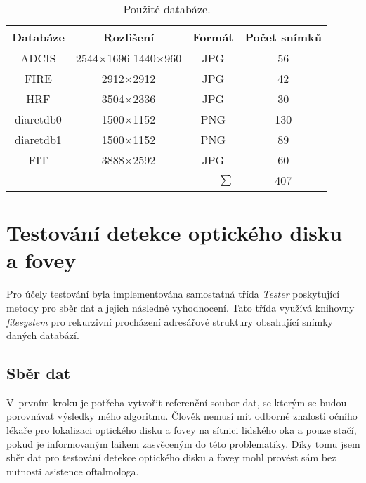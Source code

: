 \begin{table}[ht]
  \begin{center}	
    \begin{tabular}{|c|c|c|c|}
      \hline
      \textbf{Databáze} & \textbf{Rozlišení} & \textbf{Formát} & \textbf{Počet snímků} \\
      \hline
      ADCIS     & \makecell{2544$\times$1696\\ 1440$\times$960} & JPG &  56\\
      \hline
      FIRE      & 2912$\times$2912                            & JPG &  42\\
      \hline
      HRF       & 3504$\times$2336                            & JPG &  30\\
      \hline
      diaretdb0 & 1500$\times$1152                            & PNG & 130\\
      \hline
      diaretdb1 & 1500$\times$1152                            & PNG &  89\\
      \hline
      FIT       & 3888$\times$2592                            & JPG &  60\\
      \hline
      \multicolumn{3}{|r|}{$\sum$}                                   & 407\\
      \hline
    \end{tabular}
  \caption{Použité databáze.}
  \label{tab:databases}
  \end{center}
\end{table}


\section{Testování detekce optického disku a fovey}
Pro účely testování byla implementována samostatná třída \emph{Tester} poskytující metody pro sběr dat a jejich následné vyhodnocení. Tato třída využívá knihovny \emph{filesystem} pro rekurzivní procházení adresářové struktury obsahující snímky daných databází.

\subsection*{Sběr dat} 
V~prvním kroku je potřeba vytvořit referenční soubor dat, se kterým se budou porovnávat výsledky mého algoritmu. Člověk nemusí mít odborné znalosti očního lékaře pro lokalizaci optického disku a fovey na sítnici lidského oka a pouze stačí, pokud je informovaným laikem zasvěceným do této problematiky. Díky tomu jsem sběr dat pro testování detekce optického disku a fovey mohl provést sám bez nutnosti asistence oftalmologa. 

